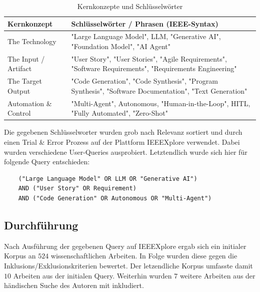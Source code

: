 \begin{table}[htbp]
    \centering
    \caption{Kernkonzepte und Schlüsselwörter}
    \label{tab:kernkonzepte_schluesselwoerter}
    \begin{tabular}{|l|p{10cm}|}
        \hline
        \textbf{Kernkonzept} & \textbf{Schlüsselwörter / Phrasen (IEEE-Syntax)} \\ \hline
        The Technology & "Large Language Model", LLM, "Generative AI", "Foundation Model", "AI Agent" \\ \hline
        The Input / Artifact & "User Story", "User Stories", "Agile Requirements", "Software Requirements", "Requirements Engineering" \\ \hline
        The Target Output & "Code Generation", "Code Synthesis", "Program Synthesis", "Software Documentation", "Text Generation" \\ \hline
        Automation \& Control & "Multi-Agent", Autonomous, "Human-in-the-Loop", HITL, "Fully Automated", "Zero-Shot" \\ \hline
    \end{tabular}
\end{table}

Die gegebenen Schlüsselworter wurden grob nach Relevanz sortiert und durch einen Trial \& Error Prozess auf der Plattform IEEEXplore verwendet. Dabei wurden verschiedene User-Queries ausprobiert. Letztendlich wurde sich hier für folgende Query entschieden:

\begin{verbatim}
    ("Large Language Model" OR LLM OR "Generative AI") 
    AND ("User Story" OR Requirement) 
    AND ("Code Generation" OR Autonomous OR "Multi-Agent")
\end{verbatim}

\subsection{Durchführung}

Nach Ausführung der gegebenen Query auf IEEEXplore ergab sich ein initialer Korpus an $524$ wissenschaftlichen Arbeiten. In Folge wurden diese gegen die Inklusions/Exklusionskriterien bewertet. Der letzendliche Korpus umfasste damit $10$ Arbeiten aus der initialen Query. Weiterhin wurden $7$ weitere Arbeiten aus der händischen Suche des Autoren mit inkludiert.



